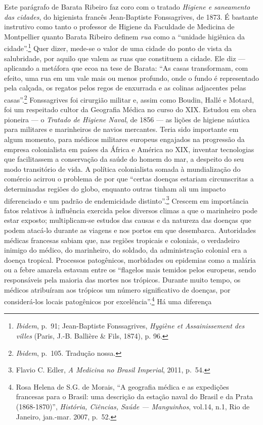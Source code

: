 Este parágrafo de Barata Ribeiro faz coro com o tratado \textit{Higiene e
saneamento das cidades}, do higienista francês Jean-Baptiste
Fonssagrives, de 1873. É bastante instrutivo como tanto o professor de
Higiene da Faculdade de Medicina de Montpellier quanto Barata Ribeiro
definem \textit{rua} como a ``unidade higiênica da cidade''.\footnote{\textit{Ibidem},
  p.~91; Jean-Baptiste Fonssagrives, \textit{Hygiène et Assainissement des
  villes} (Paris, J.-B. Ballière \& Fils, 1874), p. 96.} Quer dizer,
mede-se o valor de uma cidade do ponto de vista da salubridade, por
aquilo que valem as ruas que constituem a cidade. Ele diz --- aplicando a
metáfora que ecoa na tese de Barata: ``As casas transformam, com efeito,
uma rua em um vale mais ou menos profundo, onde o fundo é representado
pela calçada, os regatos pelos regos de enxurrada e as colinas
adjacentes pelas casas''.\footnote{\textit{Ibidem}, p.~105. Tradução
  nossa.} Fonssagrives foi cirurgião militar e, assim como Boudin, Hallé
e Motard, foi um respeitado cultor da Geografia Médica no curso do XIX.
Estudou em obra pioneira --- o \textit{Tratado de Higiene Naval}, de 1856
--- as lições de higiene náutica para militares e marinheiros de navios
mercantes. Teria sido importante em algum momento, para médicos
militares europeus engajados na progressão da empresa colonialista em
países da África e América no XIX, inventar tecnologias que facilitassem
a conservação da saúde do homem do mar, a despeito do seu modo
transitório de vida. A política colonialista somada à mundialização do
comércio acirrou o problema de por que ``certas doenças estariam
circunscritas a determinadas regiões do globo, enquanto outras tinham
ali um impacto diferenciado e um padrão de endemicidade
distinto''.\footnote{Flavio C. Edler, \textit{A Medicina no Brasil
  Imperial}, 2011, p.~54.} Crescem em importância fatos relativos à
influência exercida pelos diversos climas a que o marinheiro pode estar
exposto; multiplicam-se estudos das causas e da natureza das doenças que
podem atacá-lo durante as viagens e nos portos em que desembarca.
Autoridades médicas francesas sabiam que, nas regiões tropicais e
coloniais, o verdadeiro inimigo do médico, do marinheiro, do soldado, da
administração colonial era a doença tropical. Processos patogênicos,
morbidades ou epidemias como a malária ou a febre amarela estavam entre
os ``flagelos mais temidos pelos europeus, sendo responsáveis pela
maioria das mortes nos trópicos. Durante muito tempo, os médicos
atribuíram aos trópicos um número significativo de doenças, por
considerá-los locais patogênicos por excelência''.\footnote{Rosa Helena
  de S.G. de Morais, ``A geografia médica e as expedições francesas para
  o Brasil: uma descrição da estação naval do Brasil e da Prata
  (1868-1870)'', \textit{História, Ciências, Saúde --- Manguinhos}, vol.14,
  n.1, Rio de Janeiro, jan.-mar. 2007, p.~52.} Há uma diferença
